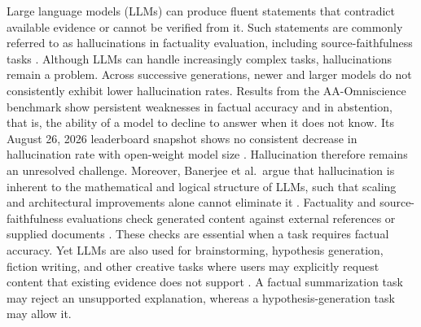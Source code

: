 \documentclass{clv2025}
\begin{document}
Large language models (LLMs) can produce fluent statements that contradict
available evidence or cannot be verified from it.
Such statements are commonly referred to as hallucinations in factuality evaluation, including source-faithfulness tasks \citep{ji_survey_2023,huang_survey_2025}.
Although LLMs can handle increasingly complex tasks, hallucinations remain a problem.
Across successive generations, newer and larger models do not
consistently exhibit lower hallucination rates.
Results from the AA-Omniscience benchmark show
persistent weaknesses in factual accuracy and in abstention, that is, the
ability of a model to decline to answer when it does not know. Its August 26,
2026 leaderboard snapshot shows no consistent decrease in hallucination rate
with open-weight model size
\citep{jackson_aaomniscience_2025,artificialanalysis_omniscience_leaderboard_2026}.
Hallucination therefore remains an unresolved challenge. Moreover, Banerjee
et al.\ argue that hallucination is inherent to the mathematical and logical
structure of LLMs, such that scaling and architectural improvements alone
cannot eliminate it \citep{banerjee_llms_2024}.
Factuality and source-faithfulness evaluations check generated content against external references or supplied documents \citep{maynez_faithfulness_2020,kryscinski_evaluating_2020,min_factscore_2023}.
These checks are essential when a task requires factual accuracy.
Yet LLMs are also used for brainstorming, hypothesis generation, fiction writing, and other creative tasks
where users may explicitly request content that existing evidence does not
support \citep{franceschelli_creativity_2024,jiang_survey_2024}.
A factual summarization task may reject an unsupported explanation, whereas a hypothesis-generation task may allow it.
\end{document}
